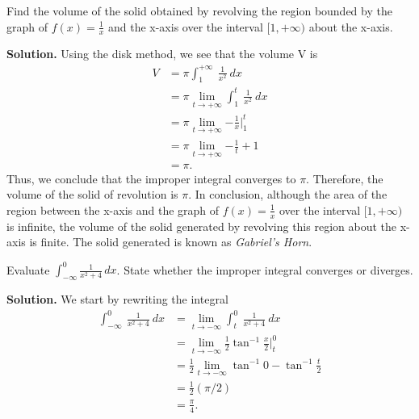 \documentclass{report}
\begin{document}
        \bigbreak \noindent 
        \begin{eg}
            Find the volume of the solid obtained by revolving the region bounded by the graph of \( f(x) = \frac{1}{x} \) and the x-axis over the interval \([1, +\infty)\) about the x-axis.
        \end{eg}
        \bigbreak \noindent 
        \textbf{Solution.} 
        Using the disk method, we see that the volume V is
        \begin{align*}
            V &=\pi \int_{1}^{+\infty}\ \frac{1}{x^{2}}\ dx \\
            &=\pi \lim\limits_{t \to +\infty}{\int_{1}^{t}\ \frac{1}{x^{2}}\ dx} \\
            &=\pi \lim\limits_{t \to +\infty}{-\frac{1}{x}}\bigg|_1^{t} \\
            &=\pi \lim\limits_{t \to +\infty}{-\frac{1}{t} +1} \\
            &=\pi
        .\end{align*}
        Thus, we conclude that the improper integral converges to  $\pi$. Therefore, the volume of the solid of revolution is  $\pi$.
        \bigbreak \noindent 
        In conclusion, although the area of the region between the x-axis and the graph of \( f(x) = \frac{1}{x} \) over the interval \([1, +\infty)\) is infinite, the volume of the solid generated by revolving this region about the x-axis is finite. The solid generated is known as \textit{Gabriel’s Horn}.

        \pagebreak \bigbreak \noindent 
        \begin{eg}
            Evaluate \( \int_{-\infty}^{0} \frac{1}{x^2 + 4} \, dx \). State whether the improper integral converges or diverges.
        \end{eg}
        \bigbreak \noindent 
        \textbf{Solution.} We start by rewriting the integral
        \begin{align*}
            \int_{-\infty}^{0}\ \frac{1}{x^{2}+4}\ dx &= \lim\limits_{t \to -\infty}{\int_{t}^{0}\ \frac{1}{x^{2}+4}\ dx} \\
                                                      &= \lim\limits_{t \to -\infty}{\frac{1}{2}\tan^{-1}{\frac{x}{2}}\bigg|_t^{0}} \\
                                                      &=\frac{1}{2} \lim\limits_{t \to -\infty}{\tan^{-1}{0} - \tan^{-1}{\frac{t}{2}}} \\
                                                      &=\frac{1}{2}\left(\pi/2\right) \\
                                                      &= \frac{\pi}{4}
        .\end{align*}
\end{document}
